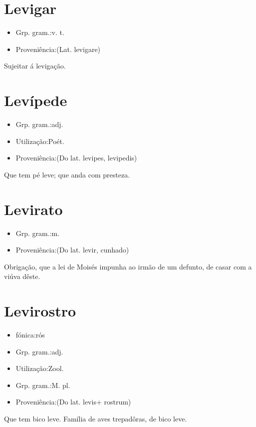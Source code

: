 \section{Levigar}
\begin{itemize}
\item {Grp. gram.:v. t.}
\end{itemize}
\begin{itemize}
\item {Proveniência:(Lat. \textunderscore levigare\textunderscore )}
\end{itemize}
Sujeitar á levigação.
\section{Levípede}
\begin{itemize}
\item {Grp. gram.:adj.}
\end{itemize}
\begin{itemize}
\item {Utilização:Poét.}
\end{itemize}
\begin{itemize}
\item {Proveniência:(Do lat. \textunderscore levipes\textunderscore , \textunderscore levipedis\textunderscore )}
\end{itemize}
Que tem pé leve; que anda com presteza.
\section{Levirato}
\begin{itemize}
\item {Grp. gram.:m.}
\end{itemize}
\begin{itemize}
\item {Proveniência:(Do lat. \textunderscore levir\textunderscore , cunhado)}
\end{itemize}
Obrigação, que a lei de Moisés impunha ao irmão de um defunto, de casar com a viúva dêste.
\section{Levirostro}
\begin{itemize}
\item {fónica:rós}
\end{itemize}
\begin{itemize}
\item {Grp. gram.:adj.}
\end{itemize}
\begin{itemize}
\item {Utilização:Zool.}
\end{itemize}
\begin{itemize}
\item {Grp. gram.:M. pl.}
\end{itemize}
\begin{itemize}
\item {Proveniência:(Do lat. \textunderscore levis\textunderscore  + \textunderscore rostrum\textunderscore )}
\end{itemize}
Que tem bico leve.
Família de aves trepadôras, de bico leve.
